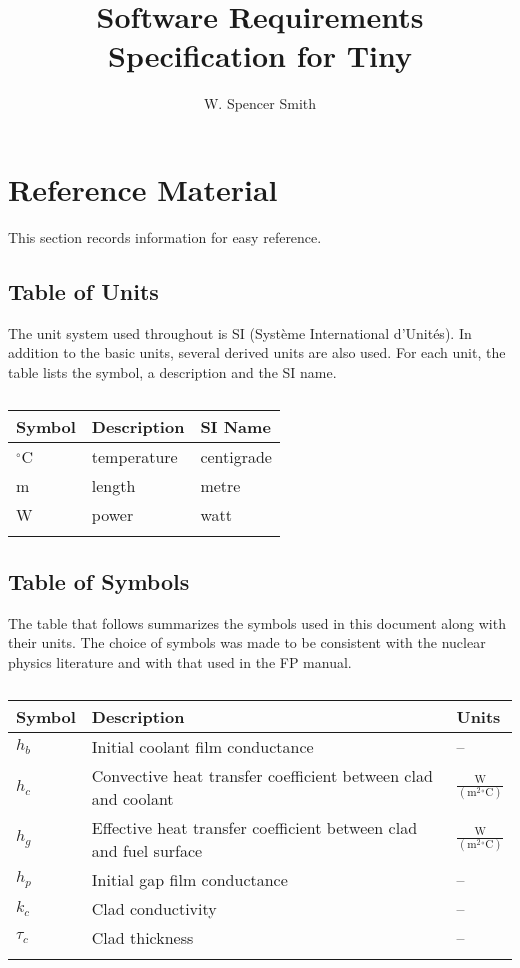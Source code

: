 \documentclass[12pt]{article}
\title{Software Requirements Specification for Tiny}
\author{W. Spencer Smith}
\begin{document}
\maketitle
\tableofcontents
\newpage
\section{Reference Material}
\label{Sec:RefMat}
This section records information for easy reference.
\subsection{Table of Units}
\label{Sec:ToU}
The unit system used throughout is SI (Système International d'Unités). In addition to the basic units, several derived units are also used. For each unit, the table lists the symbol, a description and the SI name.
\begin{longtable}{l l l}
\toprule
\textbf{Symbol} & \textbf{Description} & \textbf{SI Name}
\\
\midrule
\endhead
${}^{\circ}$C & temperature & centigrade
\\
m & length & metre
\\
W & power & watt
\\
\bottomrule
\caption{}
\label{Table:ToU}
\end{longtable}
\subsection{Table of Symbols}
\label{Sec:ToS}
The table that follows summarizes the symbols used in this document along with their units. The choice of symbols was made to be consistent with the nuclear physics literature and with that used in the FP manual.
\begin{longtabu}{l X[l] l}
\toprule
\textbf{Symbol} & \textbf{Description} & \textbf{Units}
\\
\midrule
\endhead
${h_{b}}$ & Initial coolant film conductance & --
\\
${h_{c}}$ & Convective heat transfer coefficient between clad and coolant & $\frac{\text{W}}{(\text{m}^{2}{}^{\circ}\text{C})}$
\\
${h_{g}}$ & Effective heat transfer coefficient between clad and fuel surface & $\frac{\text{W}}{(\text{m}^{2}{}^{\circ}\text{C})}$
\\
${h_{p}}$ & Initial gap film conductance & --
\\
${k_{c}}$ & Clad conductivity & --
\\
${τ_{c}}$ & Clad thickness & --
\\
\bottomrule
\caption{}
\label{Table:ToS}
\end{longtabu}
\end{document}
